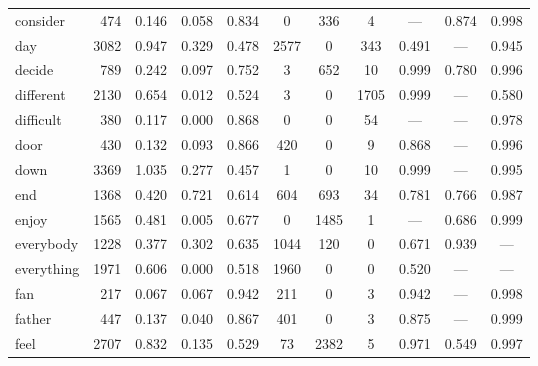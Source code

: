 \begin{landscape}
\begin{longtable}[c]{ l | r r c c | c c c | c c c }
  consider   & 474   & 0.146                   & 0.058           & 0.834      & 0         & 336         & 4            & —         & 0.874       & 0.998\\
  day        & 3082  & 0.947                   & 0.329           & 0.478      & 2577      & 0           & 343          & 0.491     & —           & 0.945\\
  decide     & 789   & 0.242                   & 0.097           & 0.752      & 3         & 652         & 10           & 0.999     & 0.780       & 0.996\\
  different  & 2130  & 0.654                   & 0.012           & 0.524      & 3         & 0           & 1705         & 0.999     & —           & 0.580\\
  difficult  & 380   & 0.117                   & 0.000           & 0.868      & 0         & 0           & 54           & —         & —           & 0.978\\
  door       & 430   & 0.132                   & 0.093           & 0.866      & 420       & 0           & 9            & 0.868     & —           & 0.996\\
  down       & 3369  & 1.035                   & 0.277           & 0.457      & 1         & 0           & 10           & 0.999     & —           & 0.995\\
  end        & 1368  & 0.420                   & 0.721           & 0.614      & 604       & 693         & 34           & 0.781     & 0.766       & 0.987\\
  enjoy      & 1565  & 0.481                   & 0.005           & 0.677      & 0         & 1485        & 1            & —         & 0.686       & 0.999\\
  everybody  & 1228  & 0.377                   & 0.302           & 0.635      & 1044      & 120         & 0            & 0.671     & 0.939       & —\\
  everything & 1971  & 0.606                   & 0.000           & 0.518      & 1960      & 0           & 0            & 0.520     & —           & —\\
  fan        & 217   & 0.067                   & 0.067           & 0.942      & 211       & 0           & 3            & 0.942     & —           & 0.998\\
  father     & 447   & 0.137                   & 0.040           & 0.867      & 401       & 0           & 3            & 0.875     & —           & 0.999\\
  feel       & 2707  & 0.832                   & 0.135           & 0.529      & 73        & 2382        & 5            & 0.971     & 0.549       & 0.997\\

\end{longtable}
\end{landscape}

